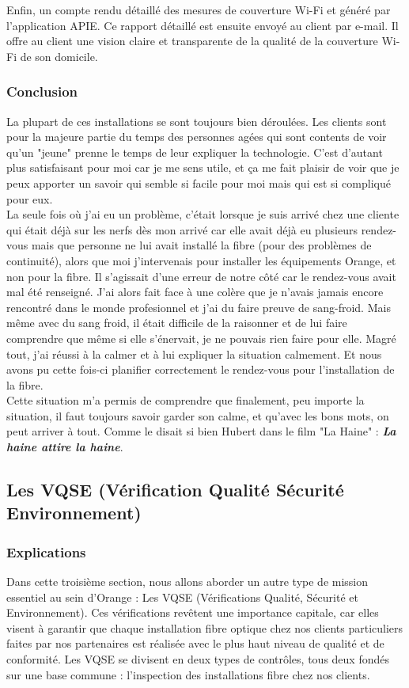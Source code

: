 \documentclass[12pt, a4paper]{article}
\begin{document}
Enfin, un compte rendu détaillé des mesures de couverture Wi-Fi
et généré par l'application APIE. Ce rapport détaillé est
ensuite envoyé au client par e-mail. Il offre au client une
vision claire et transparente de la qualité de la couverture Wi-Fi
de son domicile.
\subsubsection{Conclusion}
La plupart de ces installations se sont toujours 
bien déroulées. Les clients sont pour la majeure partie
du temps des personnes agées qui sont contents 
de voir qu'un "jeune" prenne le temps de leur 
expliquer la technologie. C'est d'autant plus 
satisfaisant pour moi car je me sens utile, et 
ça me fait plaisir de voir que je peux 
apporter un savoir qui semble si facile pour moi 
mais qui est si compliqué pour eux.\\

La seule fois où j'ai eu un problème, c'était
lorsque je suis arrivé chez une cliente qui était 
déjà sur les nerfs dès mon arrivé car elle avait
déjà eu plusieurs rendez-vous mais que personne 
ne lui avait installé la fibre (pour des problèmes
de continuité), alors que moi 
j'intervenais pour installer les équipements 
Orange, et non pour la fibre. Il s'agissait d'une erreur 
de notre côté car le rendez-vous avait mal 
été renseigné. J'ai alors fait face à une colère 
que je n'avais jamais encore rencontré dans le monde 
profesionnel et j'ai du faire preuve de sang-froid. 
Mais même avec du sang froid, il était 
difficile de la raisonner et de lui faire comprendre 
que même si elle s'énervait, je ne pouvais rien faire
pour elle. Magré tout, j'ai réussi à la calmer et
à lui expliquer la situation calmement. Et nous 
avons pu cette fois-ci planifier correctement 
le rendez-vous pour l'installation de la fibre.\\

Cette situation m'a permis de comprendre que 
finalement, peu importe la situation, il faut
toujours savoir garder son calme, et qu'avec les 
bons mots, on peut arriver à tout. Comme le disait 
si bien Hubert dans le film 
"La Haine" : \textbf{\textit{La haine attire la haine}}.

\newpage
\subsection{Les VQSE (Vérification Qualité Sécurité Environnement)}
\subsubsection{Explications}
Dans cette troisième section, nous allons
aborder un autre type de mission essentiel
au sein d'Orange : Les VQSE (Vérifications
Qualité, Sécurité et Environnement). 
Ces vérifications revêtent une
importance capitale, car elles visent
à garantir que chaque installation
fibre optique chez nos clients
particuliers faites par nos partenaires
est réalisée avec le
plus haut niveau de qualité et de conformité.
Les VQSE se divisent en deux types de contrôles,
tous deux fondés sur une base commune :
l'inspection des installations
fibre chez nos clients.
\end{document}
